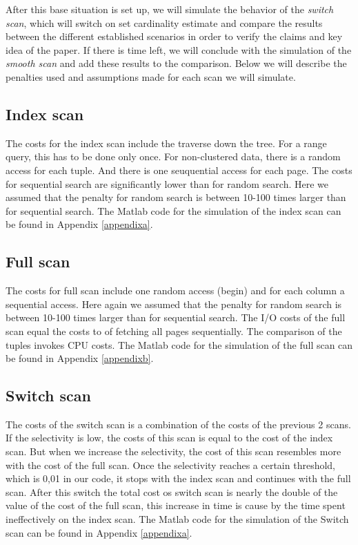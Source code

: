 \documentclass[a4paper,11pt,twoside]{article}
\begin{document}
After this base situation is set up, we will simulate the behavior of the \emph{switch scan}, which will switch on set cardinality estimate and compare the results between the different established scenarios in order to verify the claims and key idea of the paper. If there is time left, we will conclude with the simulation of the \emph{smooth scan} and add these results to the comparison. Below we will describe the penalties used and assumptions made for each scan we will simulate.

\subsection{Index scan}
The costs for the index scan include the traverse down the tree. For a range query, this has to be done only once. For non-clustered data, there is a random access for each tuple. And there is one seuquential access for each page. The costs for sequential search are significantly lower than for random search. Here we assumed that the penalty for random search is between 10-100 times larger than for sequential search. The Matlab code for the simulation of the index scan can be found in Appendix \ref{appendixa}.
\subsection{Full scan}
The costs for full scan include one random access (begin) and for each column a sequential access. Here again we assumed that the penalty for random search is between 10-100 times larger than for sequential search. The I/O costs of the full scan equal the costs to of fetching all pages sequentially. The comparison of the tuples invokes CPU costs. The Matlab code for the simulation of the full scan can be found in Appendix \ref{appendixb}.
\subsection{Switch scan}
The costs of the switch scan is a combination of the costs of the previous 2 scans. If the selectivity is low, the costs of this scan is equal to the cost of the index scan. But when we increase the selectivity, the cost of this scan resembles more with the cost of the full scan. Once the selectivity reaches a certain threshold, which is 0,01 in our code, it stops with the index scan and continues  with the full scan. After this switch the total cost os switch scan is nearly the double of the value of the cost of the full scan, this increase in time is cause by the time spent ineffectively on the index scan. The Matlab code for the simulation of the Switch scan can be found in Appendix \ref{appendixa}.
\end{document}
